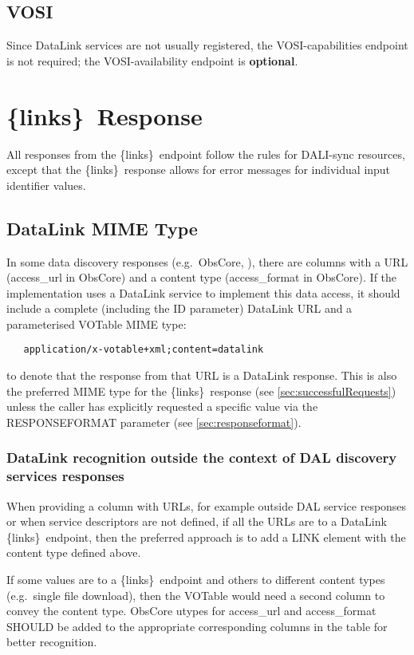 \documentclass[11pt,a4paper]{ivoa}
\newcommand{\blinks}{\{links\}}
\newcommand{\rfcoptional}{\textbf{optional}}
\begin{document}
\subsection{VOSI}

Since DataLink services are not usually registered, the VOSI-capabilities endpoint
is not required; the VOSI-availability endpoint is \rfcoptional.

\section{\blinks\ Response}

All responses from the \blinks\ endpoint follow the rules for DALI-sync
resources, except that the \blinks\ response allows for error
messages for individual input identifier values.


\subsection{DataLink MIME Type}
\label{sec:mime}

In some data discovery responses (e.g.\ ObsCore, \citet{2017ivoa.spec.0509L}),
there are columns
with a URL (access\_url in ObsCore) and a content type (access\_format in
ObsCore). If the implementation uses a DataLink service to implement this
data access, it should include a complete (including the ID parameter)
DataLink URL and a parameterised VOTable MIME type:
\begin{verbatim}
   application/x-votable+xml;content=datalink
\end{verbatim}
to denote that the response from that URL is a DataLink response.
This is also the preferred MIME type for the \blinks\ response
(see \ref{sec:successfulRequests})
unless the caller has explicitly requested a specific value
via the RESPONSEFORMAT parameter (see \ref{sec:responseformat}).

\subsubsection{DataLink recognition outside the context
               of DAL discovery services responses}

When providing a column with URLs, for example outside DAL service
responses or when service descriptors  are not defined, if all the
URLs are to a DataLink \blinks\ endpoint, then the preferred approach
is to add a LINK element with the content type defined above. 

If some values are to a \blinks\ endpoint and others to
different content types (e.g.\ single file download), then the VOTable
would need a second column to convey the content type.
ObsCore utypes for access\_url and access\_format SHOULD 
be added to the appropriate corresponding columns in the table  for
better recognition. 
\end{document}
